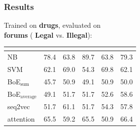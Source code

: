 \documentclass[t,xcolor={svgnames,table},aspectratio=169]{beamer}
\begin{document}
\begin{frame}
	\frametitle{Results}
	
	\Large
	Trained on \textbf{drugs},
	evaluated on \\ \textbf{forums} (\textbf{\color{green} Legal} vs. \textbf{\color{red} Illegal}):
	
	\vspace{-17mm}
	\begin{center}
		\setlength{\tabcolsep}{8pt}
		\begin{tabular}{l *{5}{R}}
		& 
		& 
		& 
		& 
		& \\
		\hline
		NB & 78.4 & 63.8 & 89.7 & 63.8 & 79.3\\
		SVM & 62.1 & 69.0 & 54.3 & 69.8 & 62.1\\
		BoE$_\mathrm{sum}$ & 45.7 & 50.9 & 49.1 & 50.9 & 50.0\\
		BoE$_\mathrm{average}$ & 49.1 & 51.7 & 51.7 & 52.6 & 58.6\\
		seq2vec & 51.7 & 61.1 & 51.7 & 54.3 & 57.8\\
		attention & 65.5 & 59.2 & 65.5 & 50.9 & 66.4
		\end{tabular}
	\end{center}
\end{frame}

\section*{}
\end{document}
